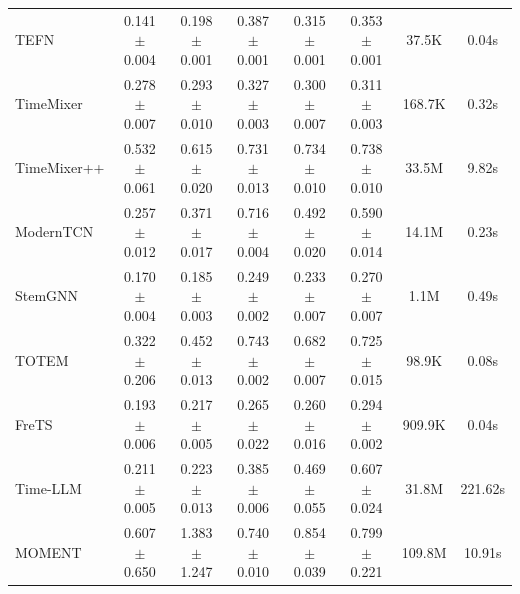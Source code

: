 \begin{table}[h]
\begin{footnotesize}
\begin{tabular}{l|ccccc|cc}
        TEFN & 0.141$\pm$0.004 & 0.198$\pm$0.001 & 0.387$\pm$0.001 & 0.315$\pm$0.001 & 0.353$\pm$0.001 & 37.5K & 0.04s \\
        TimeMixer & 0.278$\pm$0.007 & 0.293$\pm$0.010 & 0.327$\pm$0.003 & 0.300$\pm$0.007 & 0.311$\pm$0.003 & 168.7K & 0.32s \\
        TimeMixer++ & 0.532$\pm$0.061 & 0.615$\pm$0.020 & 0.731$\pm$0.013 & 0.734$\pm$0.010 & 0.738$\pm$0.010 & 33.5M & 9.82s \\
        ModernTCN & 0.257$\pm$0.012 & 0.371$\pm$0.017 & 0.716$\pm$0.004 & 0.492$\pm$0.020 & 0.590$\pm$0.014 & 14.1M & 0.23s \\
        StemGNN & 0.170$\pm$0.004 & 0.185$\pm$0.003 & 0.249$\pm$0.002 & 0.233$\pm$0.007 & 0.270$\pm$0.007 & 1.1M & 0.49s \\
        TOTEM & 0.322$\pm$0.206 & 0.452$\pm$0.013 & 0.743$\pm$0.002 & 0.682$\pm$0.007 & 0.725$\pm$0.015 & 98.9K & 0.08s \\
        FreTS & 0.193$\pm$0.006 & 0.217$\pm$0.005 & 0.265$\pm$0.022 & 0.260$\pm$0.016 & 0.294$\pm$0.002 & 909.9K & 0.04s \\
        Time-LLM & 0.211$\pm$0.005 & 0.223$\pm$0.013 & 0.385$\pm$0.006 & 0.469$\pm$0.055 & 0.607$\pm$0.024 & 31.8M & 221.62s \\
        MOMENT & 0.607$\pm$0.650 & 1.383$\pm$1.247 & 0.740$\pm$0.010 & 0.854$\pm$0.039 & 0.799$\pm$0.221 & 109.8M & 10.91s \\
        \bottomrule
    \end{tabular}
    \end{footnotesize}
\end{table}